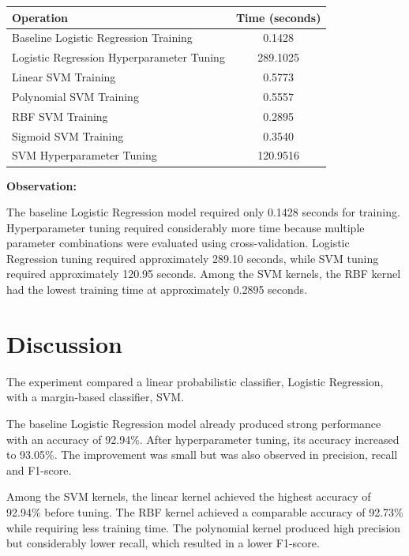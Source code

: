 \documentclass[12pt,a4paper]{article}
\begin{document}
\begin{longtable}{|p{6cm}|c|}
\hline
\textbf{Operation} & \textbf{Time (seconds)} \\ \hline

Baseline Logistic Regression Training & 0.1428 \\ \hline

Logistic Regression Hyperparameter Tuning & 289.1025 \\ \hline

Linear SVM Training & 0.5773 \\ \hline

Polynomial SVM Training & 0.5557 \\ \hline

RBF SVM Training & 0.2895 \\ \hline

Sigmoid SVM Training & 0.3540 \\ \hline

SVM Hyperparameter Tuning & 120.9516 \\ \hline

\end{longtable}

\textbf{Observation:}

The baseline Logistic Regression model required only 0.1428 seconds
for training. Hyperparameter tuning required considerably more time
because multiple parameter combinations were evaluated using
cross-validation. Logistic Regression tuning required approximately
289.10 seconds, while SVM tuning required approximately 120.95
seconds. Among the SVM kernels, the RBF kernel had the lowest training
time at approximately 0.2895 seconds.


\section{Discussion}

The experiment compared a linear probabilistic classifier,
Logistic Regression, with a margin-based classifier, SVM.

The baseline Logistic Regression model already produced strong
performance with an accuracy of 92.94\%. After hyperparameter tuning,
its accuracy increased to 93.05\%. The improvement was small but was
also observed in precision, recall and F1-score.

Among the SVM kernels, the linear kernel achieved the highest accuracy
of 92.94\% before tuning. The RBF kernel achieved a comparable
accuracy of 92.73\% while requiring less training time. The polynomial
kernel produced high precision but considerably lower recall, which
resulted in a lower F1-score.
\end{document}
